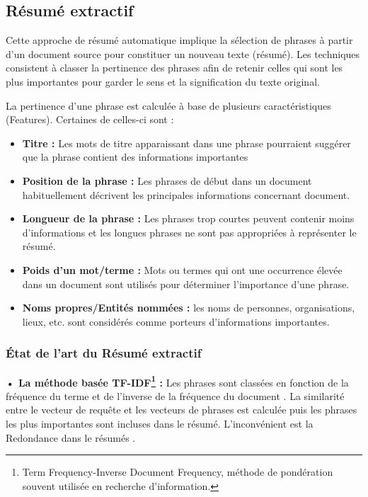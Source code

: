     \subsection{Résumé extractif}
        Cette approche de résumé automatique implique la sélection de phrases à partir d'un document source pour constituer un nouveau texte (résumé). Les techniques consistent à classer la pertinence des phrases afin de retenir celles qui sont les plus importantes pour garder le sens et la signification du texte original.

        La pertinence d'une phrase est calculée à base de plusieurs caractéristiques (Features). Certaines de celles-ci sont \cite{ratsa} :
        
        \begin{itemize}
            \item \textbf{Titre :} Les mots de titre apparaissant dans une phrase pourraient suggérer que la phrase contient des informations importantes
            \item \textbf{Position de la phrase :} Les phrases de début dans un document habituellement décrivent les principales informations concernant document.
            \item \textbf{Longueur de la phrase :} Les phrases trop courtes peuvent contenir moins d'informations et les longues phrases ne sont pas appropriées à représenter le résumé.
            \item \textbf{Poids d'un mot/terme :} Mots ou termes qui ont une occurrence élevée dans un document sont utilisés pour déterminer l'importance d'une phrase.
            \item \textbf{Noms propres/Entités nommées :} les noms de personnes, organisations, lieux, etc. sont considérés comme porteurs d'informations importantes.
        \end{itemize}   

        \subsubsection{État de l'art du Résumé extractif}
        \textbf{• La méthode basée TF-IDF\footnote{Term Frequency-Inverse Document Frequency, méthode de pondération souvent utilisée en recherche d'information.} :}
            Les phrases sont classées en fonction de la fréquence du terme et de l'inverse de la fréquence du document \cite{tfidf}. La similarité entre le vecteur de requête et les vecteurs de phrases est calculée puis les phrases les plus importantes sont incluses dans le résumé. L'inconvénient est  la Redondance dans le résumés \cite{surveysummarization}.
            
